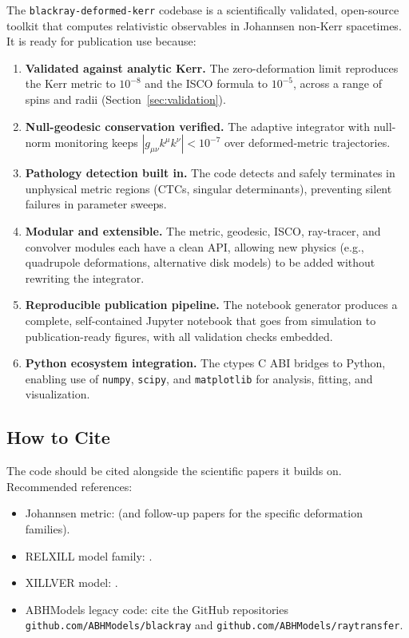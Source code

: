 \documentclass[11pt,twoside]{article}
\begin{document}
The \texttt{blackray-deformed-kerr} codebase is a scientifically validated,
open-source toolkit that computes relativistic observables in Johannsen
non-Kerr spacetimes. It is ready for publication use because:

\begin{enumerate}[label=\textbf{P\arabic*.}, leftmargin=1.5em]
\item \textbf{Validated against analytic Kerr.} The zero-deformation limit
reproduces the Kerr metric to $10^{-8}$ and the ISCO formula to $10^{-5}$,
across a range of spins and radii (Section~\ref{sec:validation}).

\item \textbf{Null-geodesic conservation verified.} The adaptive integrator
with null-norm monitoring keeps $|g_{\mu\nu}k^\mu k^\nu| < 10^{-7}$ over
deformed-metric trajectories.

\item \textbf{Pathology detection built in.} The code detects and safely
terminates in unphysical metric regions (CTCs, singular determinants),
preventing silent failures in parameter sweeps.

\item \textbf{Modular and extensible.} The metric, geodesic, ISCO, ray-tracer,
and convolver modules each have a clean API, allowing new physics (e.g.,
quadrupole deformations, alternative disk models) to be added without
rewriting the integrator.

\item \textbf{Reproducible publication pipeline.} The notebook generator
produces a complete, self-contained Jupyter notebook that goes from simulation
to publication-ready figures, with all validation checks embedded.

\item \textbf{Python ecosystem integration.} The ctypes C ABI bridges to
Python, enabling use of \texttt{numpy}, \texttt{scipy}, and \texttt{matplotlib}
for analysis, fitting, and visualization.
\end{enumerate}

\subsection{How to Cite}

The code should be cited alongside the scientific papers it builds on.
Recommended references:

\begin{itemize}
\item Johannsen metric: \cite{Johannsen2013} (and follow-up papers for the
specific deformation families).
\item RELXILL model family: \cite{Garcija2018, Garcia2019}.
\item XILLVER model: \cite{Garcila2016}.
\item ABHModels legacy code: cite the GitHub repositories
\texttt{github.com/ABHModels/blackray} and
\texttt{github.com/ABHModels/raytransfer}.
\end{itemize}
\end{document}
